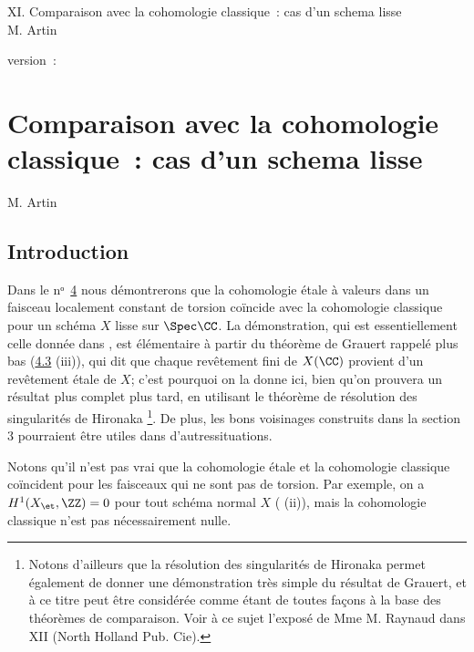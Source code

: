 \documentclass[10pt]{../fichiers-configuration-latex/smfart}
\begin{document}
\begin{center}
XI. Comparaison avec la cohomologie classique : cas d'un schema lisse\\
M. Artin 
\end{center}

version : \showgitstatus{}
\tableofcontents

\else
\chapter{Comparaison avec la cohomologie classique : cas d'un schema lisse}
\begin{center}
M. Artin 
\end{center}
\fi

\setcounter{pageoriginal}{63}

\section{Introduction}\pageoriginale

Dans le nᵒ \hyperref[XI.sec4]{4} nous démontrerons que la cohomologie étale
à valeurs dans un faisceau localement constant de torsion coïncide
avec la cohomologie classique pour un schéma $X$ lisse sur
$\Spec\CC$. La démonstration, qui est essentiellement celle
donnée dans \cite{1}, est élémentaire à partir du théorème de Grauert
rappelé plus bas (\hyperref[XI.thm4.3]{4.3} (iii)), qui dit que chaque revêtement fini de
$X(\CC)$ provient d'un revêtement étale de $X$; c'est pourquoi
on la donne ici, bien qu'on prouvera un résultat plus complet plus
tard, en utilisant le théorème de résolution des singularités de
Hironaka \cite{3} \footnote[1]{Notons d'ailleurs que la résolution des
  singularités de Hironaka permet également de donner une
  démonstration très simple du résultat de Grauert, et à ce titre peut
être considérée comme étant de toutes façons à la base des
théorèmes de comparaison. Voir à ce sujet l'exposé de Mme M. Raynaud
dans  XII (North Holland Pub. Cie).}. De plus, les bons
voisinages  construits dans la section 3 pourraient être utiles dans
d'autres\pageoriginale situations.

Notons qu'il n'est pas vrai que la cohomologie étale et la cohomologie
classique coïncident pour les faisceaux qui ne sont pas de
torsion. Par exemple, on a $H^1(X_{\et},\ZZ)=0$ pour tout
schéma normal $X$ ( (ii)), mais la cohomologie classique n'est
pas nécessairement nulle.
\end{document}
